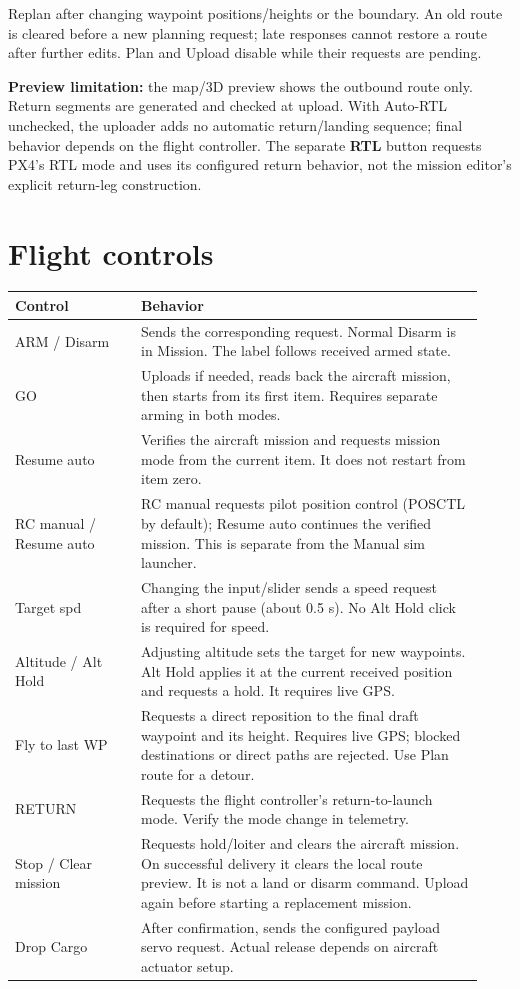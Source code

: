 \documentclass[11pt]{article}
\begin{document}
Replan after changing waypoint positions/heights or the boundary. An old route
is cleared before a new planning request; late responses cannot restore a route
after further edits. Plan and Upload disable while their requests are pending.

\textbf{Preview limitation:} the map/3D preview shows the outbound route only.
Return segments are generated and checked at upload. With Auto-RTL unchecked,
the uploader adds no automatic return/landing sequence; final behavior depends
on the flight controller. The separate \textbf{RTL} button requests PX4's RTL
mode and uses its configured return behavior, not the mission editor's explicit
return-leg construction.

\section{Flight controls}
\begin{longtable}{>{\raggedright\arraybackslash}p{0.25\linewidth} >{\raggedright\arraybackslash}p{0.68\linewidth}}
\textbf{Control} & \textbf{Behavior} \\ \hline
\endhead
ARM / Disarm & Sends the corresponding request. Normal Disarm is in Mission. The label follows received armed state. \\
GO & Uploads if needed, reads back the aircraft mission, then starts from its first item. Requires separate arming in both modes. \\
Resume auto & Verifies the aircraft mission and requests mission mode from the current item. It does not restart from item zero. \\
RC manual / Resume auto & RC manual requests pilot position control (POSCTL by default); Resume auto continues the verified mission. This is separate from the Manual sim launcher. \\
Target spd & Changing the input/slider sends a speed request after a short pause (about 0.5 s). No Alt Hold click is required for speed. \\
Altitude / Alt Hold & Adjusting altitude sets the target for new waypoints. Alt Hold applies it at the current received position and requests a hold. It requires live GPS. \\
Fly to last WP & Requests a direct reposition to the final draft waypoint and its height. Requires live GPS; blocked destinations or direct paths are rejected. Use Plan route for a detour. \\
RETURN & Requests the flight controller's return-to-launch mode. Verify the mode change in telemetry. \\
Stop / Clear mission & Requests hold/loiter and clears the aircraft mission. On successful delivery it clears the local route preview. It is not a land or disarm command. Upload again before starting a replacement mission. \\
Drop Cargo & After confirmation, sends the configured payload servo request. Actual release depends on aircraft actuator setup. \\
\end{longtable}
\end{document}
